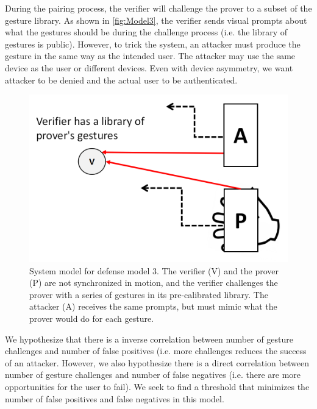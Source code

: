 \begin{itemize}
During the pairing process, the verifier will challenge the prover to a subset of the gesture library. As shown in \autoref{fig:Model3}, the verifier sends visual prompts about what the gestures should be during the challenge process (i.e. the library of gestures is public). However, to trick the system, an attacker must produce the gesture in the same way as the intended user. The attacker may use the same device as the user or different devices. Even with device asymmetry, we want attacker to be denied and the actual user to be authenticated. 

\begin{figure}[!tb]
\centering
\includegraphics[width=0.65 \linewidth]{./figures/model3.png}
\caption{System model for defense model 3. The verifier (V) and the prover (P) are not synchronized in motion, and the verifier challenges the prover with a series of gestures in its pre-calibrated library. The attacker (A) receives the same prompts, but must mimic what the prover would do for each gesture.}
\label{fig:Model3}
\end{figure}

We hypothesize that there is a inverse correlation between number of gesture challenges and number of false positives (i.e. more challenges reduces the success of an attacker. However, we also hypothesize there is a direct correlation between number of gesture challenges and number of false negatives (i.e. there are more opportunities for the user to fail). We seek to find a threshold that minimizes the number of false positives and false negatives in this model.

\end{itemize}

